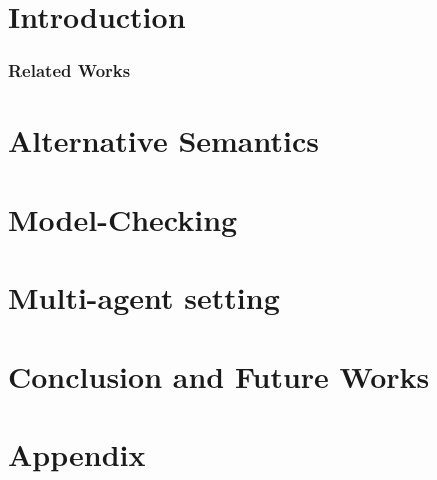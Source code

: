 \documentclass{llncs2e/llncs}
\begin{document}
\section{Introduction}
\label{sec:intro}


\subsubsection{Related Works}


\section{\ctlskd}
\label{sec:ctlskd}


\section{Alternative Semantics}
\label{sec:alternative}



\section{Model-Checking \ctlskd}
\label{sec:mc}


\section{Multi-agent setting}
\label{sec:multi}


\section{Conclusion and Future Works}
\label{sec:conclusion}


\newpage
{}



\newpage
\section{Appendix}

\end{document}
